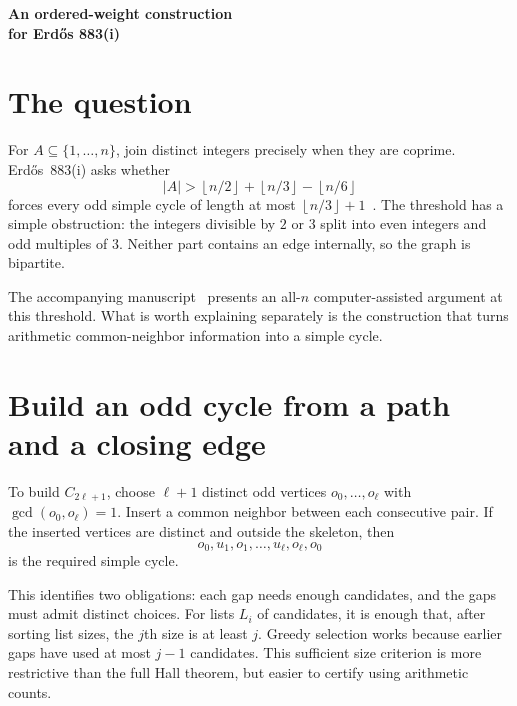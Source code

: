 \documentclass[11pt,letterpaper]{article}
\theoremstyle{remark}\newtheorem{remark}[theorem]{Remark}
\newcommand{\floor}[1]{\left\lfloor#1\right\rfloor}
\newcommand{\dochead}[3]{\begin{center}{\LARGE\bfseries #1\par}\vspace{10pt}{\large Cecil Jentges\par}\vspace{3pt}{\small Independent researcher\par}\vspace{6pt}{\small #2\par}\vspace{3pt}{\small #3\par}\end{center}}
\begin{document}
\dochead{An ordered-weight construction\\[3pt]for Erd\H{o}s 883(i)}{A proof guide and expository companion}{12 October 2026 (UTC), version 1.0}
\begin{abstract}
This guide explains how a proposed odd-cycle construction in dense coprime graphs separates its structural mechanism from arithmetic and computational evidence. The central move is to choose an odd skeleton, control weak gaps by ordering adjusted arithmetic weights, and choose distinct common-neighbor connectors. A small explicit example illustrates the construction. The guide is not a substitute for the complete proof and its certificates, and it makes no first-solver or formalization claim.
\end{abstract}

\section{The question}
For $A\subseteq\{1,\ldots,n\}$, join distinct integers precisely when they are coprime. Erd\H{o}s~883(i) asks whether
\[
 |A|>\floor{n/2}+\floor{n/3}-\floor{n/6}
\]
forces every odd simple cycle of length at most $\floor{n/3}+1$~\cite{ES97,Bloom}. The threshold has a simple obstruction: the integers divisible by $2$ or $3$ split into even integers and odd multiples of $3$. Neither part contains an edge internally, so the graph is bipartite.

The accompanying manuscript~\cite{Jentges} presents an all-$n$ computer-assisted argument at this threshold. What is worth explaining separately is the construction that turns arithmetic common-neighbor information into a simple cycle.

\section{Build an odd cycle from a path and a closing edge}
To build $C_{2\ell+1}$, choose $\ell+1$ distinct odd vertices
$o_0,\ldots,o_\ell$ with $\gcd(o_0,o_\ell)=1$. Insert a common neighbor between each consecutive pair. If the inserted vertices are distinct and outside the skeleton, then
\[
 o_0,u_1,o_1,\ldots,u_\ell,o_\ell,o_0
\]
is the required simple cycle.

This identifies two obligations: each gap needs enough candidates, and the gaps must admit distinct choices. For lists $L_i$ of candidates, it is enough that, after sorting list sizes, the $j$th size is at least $j$. Greedy selection works because earlier gaps have used at most $j-1$ candidates. This sufficient size criterion is more restrictive than the full Hall theorem, but easier to certify using arithmetic counts.
\end{document}
